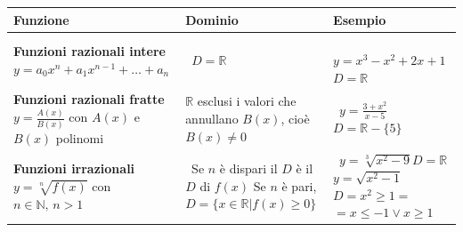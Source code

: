   \begin{tabularx}{\textwidth}{XXX}
  \toprule
  Funzione & Dominio  & Esempio \\
  \midrule
  
  \textbf{Funzioni razionali intere} 
\newline\(y=a_0x^n+a_1x^{n-1}+\dots+a_n\) 
  & \(\,\) \newline \(D=\mathbb{R}\) 
  & \(\,\) \newline \(y=x^3-x^2+2x+1\) \newline \(D=\mathbb{R}\) \\
  \midrule

  \textbf{Funzioni razionali fratte} \newline 
\(y=\frac{A(x)}{B(x)}\) \newline con \(A(x)\) e \(B(x)\) polinomi 
  & \(\mathbb{R}\) esclusi i valori che annullano \(B(x)\), cioè 
\newline \(B(x)\neq 0\)
  & \(\,\) \newline\(y=\frac{3+x^2}{x-5}\)\newline \(D= 
\mathbb{R}-\{5\}\) \\
  \midrule

  \textbf{Funzioni irrazionali} \newline \(y=\sqrt[n]{f(x)}\) 
\newline con \(n\in\mathbb{N},\,n>1\) 
  & \(\,\) \newline Se \(n\) è dispari il \(D\) è il \(D\) di \(f(x)\) 
\newline \newline Se \(n\) è pari, \newline\(D=\{x\in\mathbb{R}\vert 
f(x)\geq0\}\)
  & \(\,\) \newline \(y=\sqrt[3]{x^2-9}\)\newline \(D=\mathbb{R}\) 
\newline \newline \(y=\sqrt{x^2-1}\)\newline \(D=x^2\geq1=\)\newline 
\(=x\leq-1\lor x\geq1\) \\
  \midrule
\end{tabularx}
  


